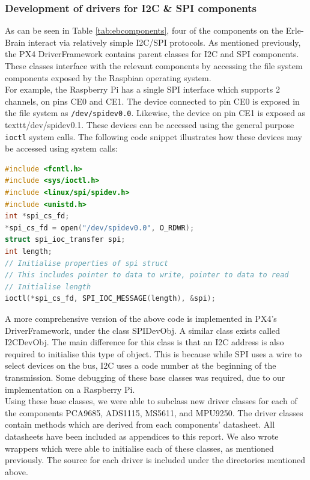\documentclass[capstone_report.tex]{subfiles}
\begin{document}
    \subsubsection{Development of drivers for I2C \& SPI components}
    As can be seen in Table \ref{tab:ebcomponents}, four of the components on the Erle-Brain interact via relatively simple I2C/SPI protocols. As mentioned previously, the PX4 DriverFramework contains parent classes for I2C and SPI components. These classes interface with the relevant components by accessing the file system components exposed by the Raspbian operating system. \\

    For example, the Raspberry Pi has a single SPI interface which supports 2 channels, on pins CE0 and CE1. The device connected to pin CE0 is exposed in the file system as \texttt{/dev/spidev0.0}. Likewise, the device on pin CE1 is exposed as texttt{/dev/spidev0.1}. These devices can be accessed using the general purpose \texttt{ioctl} system calls. The following code snippet illustrates how these devices may be accessed using system calls:

\begin{lstlisting}[language=c++]
#include <fcntl.h>
#include <sys/ioctl.h>     
#include <linux/spi/spidev.h>
#include <unistd.h>
int *spi_cs_fd;
*spi_cs_fd = open("/dev/spidev0.0", O_RDWR);
struct spi_ioc_transfer spi;
int length;
// Initialise properties of spi struct
// This includes pointer to data to write, pointer to data to read
// Initialise length
ioctl(*spi_cs_fd, SPI_IOC_MESSAGE(length), &spi);
\end{lstlisting}

    A more comprehensive version of the above code is implemented in PX4's DriverFramework, under the class SPIDevObj. A similar class exists called I2CDevObj. The main difference for this class is that an I2C address is also required to initialise this type of object. This is because while SPI uses a wire to select devices on the bus, I2C uses a code number at the beginning of the transmission. Some debugging of these base classes was required, due to our implementation on a Raspberry Pi. \\

    Using these base classes, we were able to subclass new driver classes for each of the components PCA9685, ADS1115, MS5611, and MPU9250. The driver classes contain methods which are derived from each components' datasheet. All datasheets have been included as appendices to this report. We also wrote wrappers which were able to initialise each of these classes, as mentioned previously. The source for each driver is included under the directories mentioned above.\\
\end{document}
